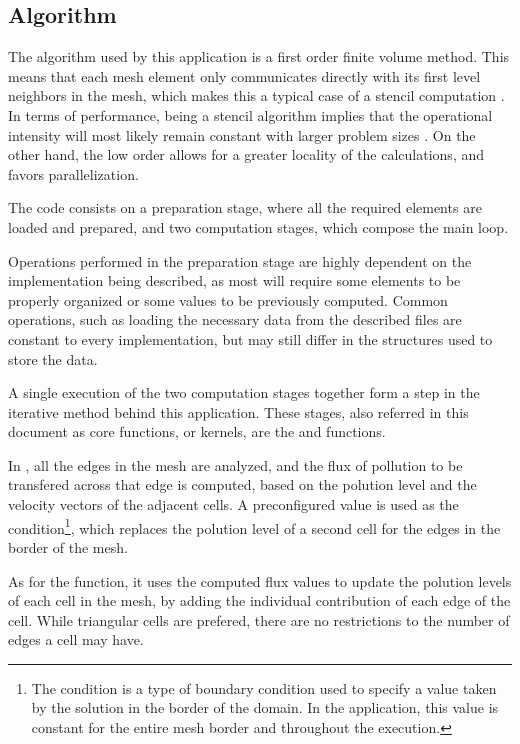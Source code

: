 \subsection{Algorithm}
\label{sec:210}
The algorithm used by this application is a first order finite volume method. This means that each mesh element only communicates directly with its first level neighbors in the mesh, which makes this a typical case of a stencil computation \cite{mitlab3}. In terms of performance, being a stencil algorithm implies that the operational intensity will most likely remain constant with larger problem sizes \cite{williams2008,parlab2008}. On the other hand, the low order allows for a greater locality of the calculations, and favors parallelization.

The code consists on a preparation stage, where all the required elements are loaded and prepared, and two computation stages, which compose the main loop.

Operations performed in the preparation stage are highly dependent on the implementation being described, as most will require some elements to be properly organized or some values to be previously computed. Common operations, such as loading the necessary data from the described files are constant to every implementation, but may still differ in the structures used to store the data.

A single execution of the two computation stages together form a step in the iterative method behind this application. These stages, also referred in this document as core functions, or kernels, are the \computeflux and \update functions.

In \computeflux, all the edges in the mesh are analyzed, and the flux of pollution to be transfered across that edge is computed, based on the polution level and the velocity vectors of the adjacent cells. A preconfigured value is used as the \dirichlet condition\footnote{The \dirichlet condition is a type of boundary condition used to specify a value taken by the solution in the border of the domain. In the \polu application, this value is constant for the entire mesh border and throughout the execution.}, which replaces the polution level of a second cell for the edges in the border of the mesh.

As for the \update function, it uses the computed flux values to update the polution levels of each cell in the mesh, by adding the individual contribution of each edge of the cell. While triangular cells are prefered, there are no restrictions to the number of edges a cell may have.
